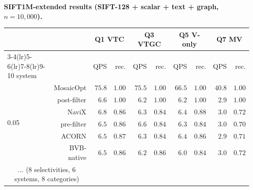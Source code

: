 \documentclass[sigconf,nonacm,review]{acmart}
\theoremstyle{plain}
\theoremstyle{definition}
\theoremstyle{remark}
\begin{document}
\noindent\textbf{SIFT1M-extended results (SIFT-128 + scalar + text + graph, $n = 10{,}000$).}
\begin{center}
\begin{tabular}{l rrr rrr rrr}
\toprule
& & \multicolumn{2}{c}{Q1 VTC} & \multicolumn{2}{c}{Q3 VTGC}
& \multicolumn{2}{c}{Q5 V-only} & \multicolumn{2}{c}{Q7 MV} \\
\cmidrule(lr){3-4}\cmidrule(lr){5-6}\cmidrule(lr){7-8}\cmidrule(lr){9-10}
system & & QPS & rec. & QPS & rec. & QPS & rec. & QPS & rec. \\
\midrule
\multirow{6}{*}{0.05}
  & MosaicOpt  & $75.8$ & $1.00$ & $75.5$ & $1.00$
                & $66.5$ & $1.00$ & $40.8$ & $1.00$ \\
  & post-filter & $6.6$  & $1.00$ & $6.2$  & $1.00$
                & $6.2$  & $1.00$ & $2.9$  & $1.00$ \\
  & NaviX      & $6.8$  & $0.86$ & $6.3$  & $0.84$
                & $6.4$  & $0.88$ & $3.0$  & $0.72$ \\
  & pre-filter  & $6.5$  & $0.86$ & $6.6$  & $0.84$
                & $6.3$  & $0.84$ & $3.0$  & $0.70$ \\
  & ACORN      & $6.5$  & $0.87$ & $6.3$  & $0.84$
                & $6.4$  & $0.86$ & $2.9$  & $0.71$ \\
  & BVB-native & $6.5$  & $0.86$ & $6.2$  & $0.86$
                & $6.0$  & $0.84$ & $3.0$  & $0.72$ \\
\midrule
\multicolumn{2}{c}{... (8 selectivities, 6 systems, 8 categories)}
& \multicolumn{8}{c}{} \\
\bottomrule
\end{tabular}
\end{center}
\end{document}
